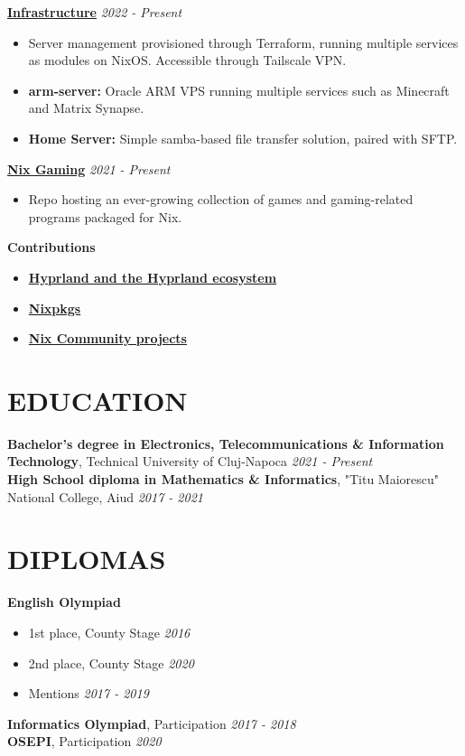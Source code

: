 \documentclass[margin]{res}
\begin{document}
\begin{resume}
  {\bf \href{https://github.com/fufexan/infra}{Infrastructure}} \hfill \textit{2022 - Present}\\
  \begin{itemize}
    \item Server management provisioned through Terraform, running multiple services as modules on NixOS. Accessible through Tailscale VPN.
    \item \textbf{arm-server:} Oracle ARM VPS running multiple services such as Minecraft and Matrix Synapse.
    \item \textbf{Home Server:} Simple samba-based file transfer solution, paired with SFTP.
  \end{itemize}

  {\bf \href{https://github.com/fufexan/nix-gaming}{Nix Gaming}} \hfill \textit{2021 - Present}\\
  \begin{itemize}
    \item Repo hosting an ever-growing collection of games and gaming-related programs packaged for Nix.
  \end{itemize}

  {\bf Contributions}
  \begin{itemize}
    \item \href {https://github.com/hyprwm}{\textbf{Hyprland and the Hyprland ecosystem}}
    \item \href {https://github.com/nixos/nixpkgs}{\textbf{Nixpkgs}}
    \item \href {https://github.com/nix-community}{\textbf{Nix Community projects}}
  \end{itemize}

  \section{EDUCATION}
  {\bf Bachelor's degree in Electronics, Telecommunications \& Information Technology}, Technical University of Cluj-Napoca \hfill \textit{2021 - Present}\\
  {\bf High School diploma in Mathematics \& Informatics}, "Titu Maiorescu" National College, Aiud \hfill \textit{2017 - 2021}\\

  \section{DIPLOMAS}
  {\bf English Olympiad}
  \begin{itemize}
    \item 1st place, County Stage \hfill \textit{2016}
    \item 2nd place, County Stage \hfill \textit{2020}
    \item Mentions \hfill \textit{2017 - 2019}
  \end{itemize}
  {\bf Informatics Olympiad}, Participation \hfill \textit{2017 - 2018}\\
  {\bf OSEPI}, Participation \hfill \textit{2020}\\


\end{resume}
\end{document}
